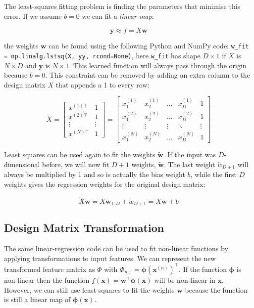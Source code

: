 \documentclass{article}
\begin{document}
The least-squares fitting problem is finding the parameters that minimise this error.
If we assume $b=0$ we can fit a \emph{linear map}:

\[
	\mathbf{y} \approx f = X \mathbf{w}
\]

the weights $\mathbf{w}$ can be found using the following Python and NumPy code: \verb|w_fit = np.linalg.lstsq(X, yy, rcond=None)|, here \verb|w_fit| has shape $D \times 1$ if $X$ is $N \times D$ and $\mathbf{y}$ is $N \times 1$.
This learned function will always pass through the origin because $b=0$.
This constraint can be removed by adding an extra column to the design matrix $X$ that appends a 1 to every row:

\[
    \tilde{X} = \begin{bmatrix}
           x^{(1) \top} & 1 \\
           x^{(2) \top} & 1  \\
           \vdots & \vdots \\
           x^{(N)\top} & 1 
         \end{bmatrix}
      = \begin{bmatrix}
           x_{1}^{(1)} & x_{2}^{(1)} & \dots & x_{D}^{(1)} & 1 \\
           x_{1}^{(2)} & x_{2}^{(2)} & \dots & x_{D}^{(2)}  & 1\\
           \vdots & \vdots & \vdots & \ddots & \vdots \\
           x_{1}^{(N)} & x_{2}^{(N)} & \dots & x_{D}^{(N)} & 1
         \end{bmatrix}
\]

Least squares can be used again to fit the weights $\mathbf{\tilde{w}}$. If the input was $D$-dimensional before, we will now fit $D+1$ weights, $\mathbf{\tilde{w}}$.
The last weight $\tilde{w}_{D+1}$ will always be multiplied by 1 and so is actually the bias weight $b$, while the first $D$ weights gives the regression weights for the original design matrix:

\[
	\tilde{X}\mathbf{\tilde{w}} = X\mathbf{\tilde{w}}_{1:D} + \tilde{w}_{D+1} = X \mathbf{w} + b
\]

\subsection{Design Matrix Transformation}

The same linear-regression code can be used to fit non-linear functions by applying transformations to input features.
We can represent the new transformed feature matrix as $\Phi$ with $\Phi_{n,:} = \pmb{\phi}(\mathbf{x}^{(n)})^\top$. If the function $\pmb{\phi}$ is non-linear then the function $f(\mathbf{x}) = \mathbf{w}^\top \pmb{\phi}(\mathbf{x})$ will be non-linear in $\mathbf{x}$.
However, we can still use least-squares to fit the weights $\mathbf{w}$ because the function is still a linear map of $\pmb{\phi}(\mathbf{x})$.
\end{document}
